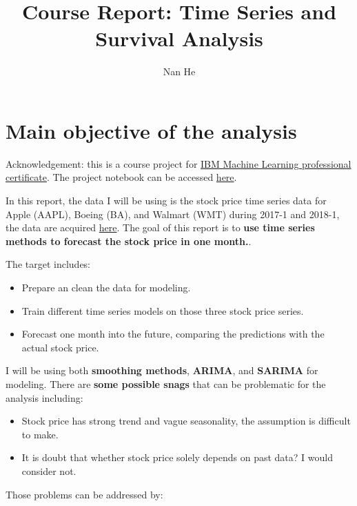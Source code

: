 \documentclass[11pt]{article}
\title{Course Report: Time Series and Survival Analysis}
\author{Nan He}
\date{}
\begin{document}
\maketitle


\section{Main objective of the analysis}\label{section-introduction-1}
Acknowledgement: this is a course project for \href{https://www.coursera.org/professional-certificates/ibm-machine-learning}{IBM Machine Learning professional certificate}. The project notebook can be accessed \href{https://github.com/henankf223/Assignment-5-autoencoder/blob/90f6268afb6d2c90be1537a7584892084cdb9411/autoencoder.ipynb}{here}.

In this report, the data I will be using is the stock price time series data for Apple (AAPL), Boeing (BA), and Walmart (WMT) during 2017-1 and 2018-1, the data are acquired  \href{https://www.kaggle.com/imakash3011/customer-personality-analysis}{here}.
The goal of this report is to \textbf{use time series methods to forecast the stock price in one month.}. 

The target includes: 

\begin{itemize}
\item Prepare an clean the data for modeling.
\item Train different time series models on those three stock price series.
\item Forecast one month into the future, comparing the predictions with the actual stock price.
\end{itemize}

I will be using both \textbf{smoothing methods}, \textbf{ARIMA}, and \textbf{SARIMA} for modeling.
There are \textbf{some possible snags} that can be problematic for the analysis including:

\begin{itemize}
\item Stock price has strong trend and vague seasonality, the assumption is difficult to make.
\item It is doubt that whether stock price solely depends on past data? I would consider not.
\end{itemize}

Those problems can be addressed by:
\end{document}
